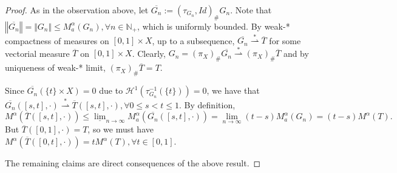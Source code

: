 \documentclass[fleqn]{article}
\theoremstyle{definition}
\theoremstyle{remark}
\newcommand{\linf}[1][n]{\underline{\lim}_{#1\rightarrow\infty}} %
\renewcommand{\l}[1][n]{\lim_{#1\rightarrow\infty}} %
\renewcommand{\H}{\mathcal{H}^1} %
\newcommand{\wstar}{\stackrel{*}{\rightharpoonup}} %
\begin{document}
\begin{proof}
As in the observation above, let $\overline{G_n}:= (\tau_{G_n},Id)_\# G_n$. Note that $\left\Vert \overline{G_n} \right\Vert = \Vert G_n \Vert \le M_a^\alpha(G_n), \forall n\in\mathbb{N}_+$, which is uniformly bounded. By weak-* compactness of measures on $[0,1]\times X$, up to a subsequence, $\overline{G_n} \wstar \overline{T}$ for some vectorial measure $\overline{T}$ on $[0,1]\times X$. Clearly, $G_n =\left(\pi_X\right)_\# \overline{G_n} \wstar \left(\pi_X\right)_\# \overline{T}$ and by uniqueness of weak-* limit, $\left(\pi_X\right)_\# \overline{T} = T$.
\par
Since $\overline{G_n}(\{t\}\times X) =0$ due to $\H\left(\tau_{G_n}^{-1}(\{t\})\right) =0$, we have that $\overline{G_n}([s,t],\cdot) \wstar \overline{T}([s,t],\cdot), \forall 0\le s<t \le 1$. By definition,
$$M^\alpha\left( \overline{T}([s,t],\cdot) \right) \le \linf M_a^\alpha\left( \overline{G_n}([s,t],\cdot) \right) = \l (t-s) M_a^\alpha(G_n) = (t-s) M^\alpha(T).$$
But $\overline{T}([0,1],\cdot) = T$, so we must have $M^\alpha \left( \overline{T}([0,t],\cdot) \right) = t M^\alpha(T), \forall t\in[0,1]$.
\par
The remaining claims are direct consequences of the above result.
\end{proof}
\end{document}
